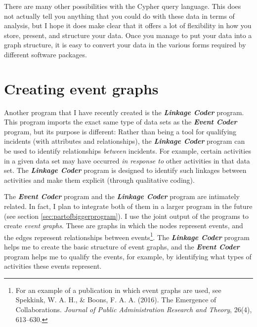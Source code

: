 \documentclass{memoir}
\begin{document}

There are many other possibilities with the Cypher query language. This does not actually tell you anything that you could do with these data in terms of analysis, but I hope it does make clear that it offers a lot of flexibility in how you store, present, and structure your data. Once you manage to put your data into a graph structure, it is easy to convert your data in the various forms required by different software packages.

\section{Creating event graphs}
\label{sec:creatingeventgraphs}

Another program that I have recently created is the \emph{\textbf{Linkage Coder}} program. This program imports the exact same type of data sets as the \emph{\textbf{Event Coder}} program, but its purpose is different: Rather than being a tool for qualifying incidents (with attributes and relationships), the \textbf{\emph{Linkage Coder}} program can be used to identify relationships \emph{between} incidents. For example, certain activities in a given data set may have occurred \emph{in response to} other activities in that data set. The \emph{\textbf{Linkage Coder}} program is designed to identify such linkages between activities and make them explicit (through qualitative coding).

The \textbf{\emph{Event Coder}} program and the \textbf{\emph{Linkage Coder}} program are intimately related. In fact, I plan to integrate both of them in a larger program in the future (see section \ref{sec:partofbiggerprogram}). I use the joint output of the programs to create \emph{event graphs}. These are graphs in which the nodes represent events, and the edges represent relationships between events\footnote{For an example of a publication in which event graphs are used, see Spekkink, W. A. H., \& Boons, F. A. A. (2016). The Emergence of Collaborations. \emph{Journal of Public Administration Research and Theory}, 26(4), 613–630.}. The \textbf{\emph{Linkage Coder}} program helps me to create the basic structure of event graphs, and the \textbf{\emph{Event Coder}} program helps me to qualify the events, for example, by identifying what types of activities these events represent.
\end{document}
